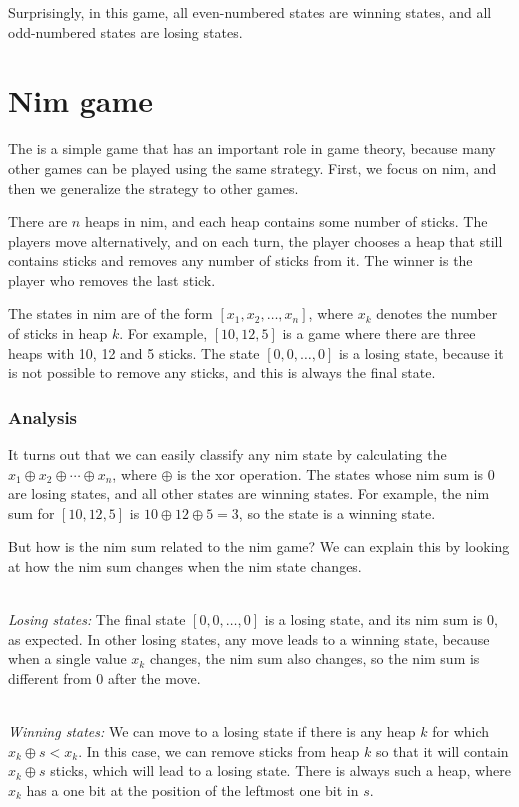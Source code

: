 Surprisingly, in this game,
all even-numbered states are winning states,
and all odd-numbered states are losing states.

\section{Nim game}


The  is a simple game that
has an important role in game theory,
because many other games can be played using
the same strategy.
First, we focus on nim,
and then we generalize the strategy
to other games.

There are $n$ heaps in nim,
and each heap contains some number of sticks.
The players move alternatively,
and on each turn, the player chooses
a heap that still contains sticks
and removes any number of sticks from it.
The winner is the player who removes the last stick.

The states in nim are of the form
$[x_1,x_2,\ldots,x_n]$,
where $x_k$ denotes the number of sticks in heap $k$.
For example, $[10,12,5]$ is a game where
there are three heaps with 10, 12 and 5 sticks.
The state $[0,0,\ldots,0]$ is a losing state,
because it is not possible to remove any sticks,
and this is always the final state.

\subsubsection{Analysis}

It turns out that we can easily classify
any nim state by calculating
the  $x_1 \oplus x_2 \oplus \cdots \oplus x_n$,
where $\oplus$ is the xor operation.
The states whose nim sum is 0 are losing states,
and all other states are winning states.
For example, the nim sum for
$[10,12,5]$ is $10 \oplus 12 \oplus 5 = 3$,
so the state is a winning state.

But how is the nim sum related to the nim game?
We can explain this by looking at how the nim
sum changes when the nim state changes.

~\\
\noindent
\textit{Losing states:}
The final state $[0,0,\ldots,0]$ is a losing state,
and its nim sum is 0, as expected.
In other losing states, any move leads to
a winning state, because when a single value $x_k$ changes,
the nim sum also changes, so the nim sum
is different from 0 after the move.

~\\
\noindent
\textit{Winning states:}
We can move to a losing state if
there is any heap $k$ for which $x_k \oplus s < x_k$.
In this case, we can remove sticks from
heap $k$ so that it will contain $x_k \oplus s$ sticks,
which will lead to a losing state.
There is always such a heap, where $x_k$
has a one bit at the position of the leftmost
one bit in $s$.

